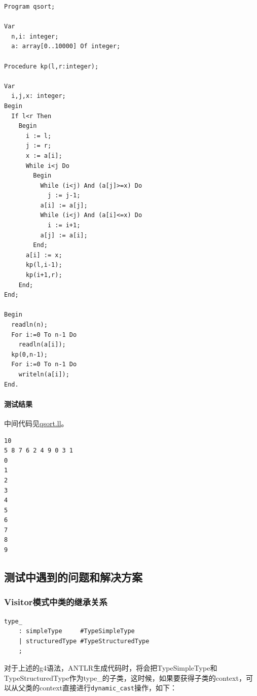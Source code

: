 \documentclass[lang=cn,11pt,a4paper,cite=authornum]{paper}
\begin{document}
\begin{code}
\begin{verbatim}
Program qsort;

Var 
  n,i: integer;
  a: array[0..10000] Of integer;

Procedure kp(l,r:integer);

Var 
  i,j,x: integer;
Begin
  If l<r Then
    Begin
      i := l;
      j := r;
      x := a[i];
      While i<j Do
        Begin
          While (i<j) And (a[j]>=x) Do
            j := j-1;
          a[i] := a[j];
          While (i<j) And (a[i]<=x) Do
            i := i+1;
          a[j] := a[i];
        End;
      a[i] := x;
      kp(l,i-1);
      kp(i+1,r);
    End;
End;

Begin
  readln(n);
  For i:=0 To n-1 Do
    readln(a[i]);
  kp(0,n-1);
  For i:=0 To n-1 Do
    writeln(a[i]);
End.
\end{verbatim}
\end{code}

\paragraph{测试结果} 中间代码见\href{run:../test/qsort.ll}{qsort.ll}。

\begin{code}
\begin{verbatim}
10
5 8 7 6 2 4 9 0 3 1 
0
1
2
3
4
5
6
7
8
9
\end{verbatim}
\end{code}

\subsection{测试中遇到的问题和解决方案}

\subsubsection{Visitor模式中类的继承关系}

\begin{code}
\begin{verbatim}
type_
    : simpleType     #TypeSimpleType
    | structuredType #TypeStructuredType
    ;
\end{verbatim}
\end{code}

对于上述的g4语法，ANTLR生成代码时，将会把TypeSimpleType和TypeStructuredType作为type\_的子类，这时候，如果要获得子类的context，可以从父类的context直接进行\texttt{dynamic_cast}操作，如下：
\end{document}
